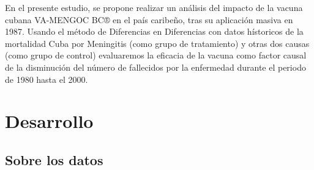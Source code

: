 \documentclass[a4paper,10pt,twocolumn]{article}
\begin{document}
		En el presente estudio, se propone realizar un análisis del impacto de la vacuna cubana VA-MENGOC BC® en el país caribeño, tras su aplicación masiva en 1987. Usando el método de Diferencias en Diferencias con datos hístoricos de la mortalidad Cuba por Meningitis (como grupo de tratamiento) y otras dos causas (como grupo de control) evaluaremos la eficacia de la vacuna como factor causal de la disminución del número de fallecidos por la enfermedad durante el periodo de 1980 hasta el 2000.
		



\section{Desarrollo}\label{sec:dev}
	  \subsection{Sobre los datos}\label{sub:data}
  
  
\end{document}
